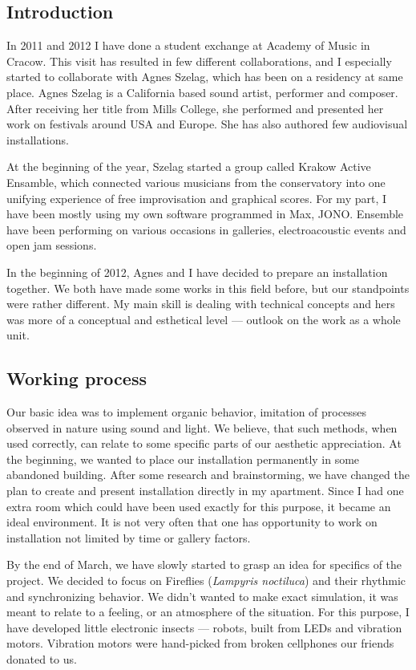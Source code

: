 \documentclass[12pt,a4paper,oneside]{report}
\begin{document}
\subsection{Introduction} In 2011 and 2012 I have done a student exchange at Academy of Music in Cracow. This visit has resulted in few different collaborations, and I especially started to collaborate with Agnes Szelag, which has been on a residency at same place. Agnes Szelag is a California based sound artist, performer and composer. After receiving her title from Mills College, she performed and presented her work on festivals around USA and Europe. She has also authored few audiovisual installations. 

At the beginning of the year, Szelag started a group called Krakow Active Ensamble, which connected various musicians from the conservatory into one unifying experience of free improvisation and graphical scores. For my part, I have been mostly using my own software programmed in Max, JONO. Ensemble have been performing on various occasions in galleries, electroacoustic events and open jam sessions.

In the beginning of 2012, Agnes and I have decided to prepare an installation together. We both have made some works in this field before, but our standpoints were rather different. My main skill is dealing with technical concepts and hers was more of a conceptual and esthetical level --- outlook on the work as a whole unit. 

\subsection{Working process} Our basic idea was to implement organic behavior, imitation of processes observed in nature using sound and light. We believe, that such methods, when used correctly, can relate to some specific parts of our aesthetic appreciation. At the beginning, we wanted to place our installation permanently in some abandoned building. After some research and brainstorming, we have changed the plan to create and present installation directly in my apartment. Since I had one extra room which could have been used exactly for this purpose, it became an ideal environment. It is not very often that one has opportunity to work on installation not limited by time or gallery factors.

By the end of March, we have slowly started to grasp an idea for specifics of the project. We decided to focus on Fireflies (\emph{Lampyris noctiluca}) and their rhythmic and synchronizing behavior. We didn't wanted to make exact simulation, it was meant to relate to a feeling, or an atmosphere of the situation. For this purpose, I have developed little electronic insects --- robots, built from LEDs and vibration motors. Vibration motors were hand-picked from broken cellphones our friends donated to us. 
\end{document}
